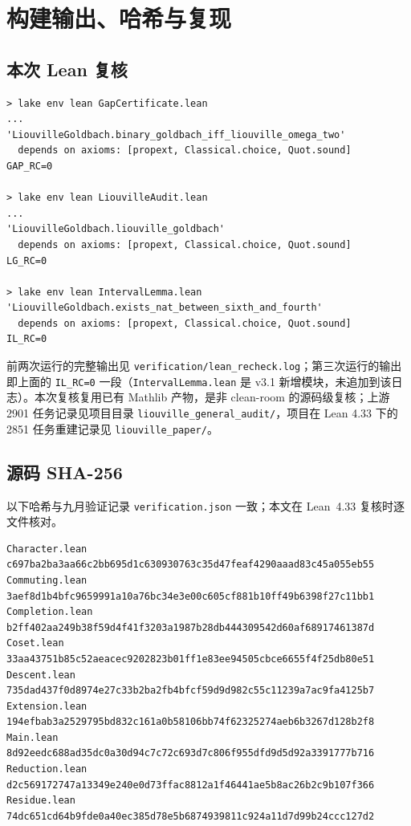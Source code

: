 \documentclass[11pt,a4paper]{ctexart}
\theoremstyle{plain}
\theoremstyle{definition}
\begin{document}
\section{构建输出、哈希与复现}
\label{app:hashes}

\subsection*{本次 Lean 复核}

\begin{verbatim}
> lake env lean GapCertificate.lean
...
'LiouvilleGoldbach.binary_goldbach_iff_liouville_omega_two'
  depends on axioms: [propext, Classical.choice, Quot.sound]
GAP_RC=0

> lake env lean LiouvilleAudit.lean
...
'LiouvilleGoldbach.liouville_goldbach'
  depends on axioms: [propext, Classical.choice, Quot.sound]
LG_RC=0

> lake env lean IntervalLemma.lean
'LiouvilleGoldbach.exists_nat_between_sixth_and_fourth'
  depends on axioms: [propext, Classical.choice, Quot.sound]
IL_RC=0
\end{verbatim}

前两次运行的完整输出见 \texttt{verification/lean\_recheck.log}；第三次运行的输出即上面的 \texttt{IL\_RC=0} 一段（\texttt{IntervalLemma.lean} 是 v3.1 新增模块，未追加到该日志）。本次复核复用已有 Mathlib 产物，是非 clean-room 的源码级复核；上游 2901 任务记录见项目目录 \texttt{liouville\_general\_audit/}，项目在 Lean 4.33 下的 2851 任务重建记录见 \texttt{liouville\_paper/}。

\subsection*{源码 SHA-256}

以下哈希与九月验证记录 \texttt{verification.json} 一致；本文在 Lean~4.33 复核时逐文件核对。

{\footnotesize
\begin{verbatim}
Character.lean   c697ba2ba3aa66c2bb695d1c630930763c35d47feaf4290aaad83c45a055eb55
Commuting.lean   3aef8d1b4bfc9659991a10a76bc34e3e00c605cf881b10ff49b6398f27c11bb1
Completion.lean  b2ff402aa249b38f59d4f41f3203a1987b28db444309542d60af68917461387d
Coset.lean       33aa43751b85c52aeacec9202823b01ff1e83ee94505cbce6655f4f25db80e51
Descent.lean     735dad437f0d8974e27c33b2ba2fb4bfcf59d9d982c55c11239a7ac9fa4125b7
Extension.lean   194efbab3a2529795bd832c161a0b58106bb74f62325274aeb6b3267d128b2f8
Main.lean        8d92eedc688ad35dc0a30d94c7c72c693d7c806f955dfd9d5d92a3391777b716
Reduction.lean   d2c569172747a13349e240e0d73ffac8812a1f46441ae5b8ac26b2c9b107f366
Residue.lean     74dc651cd64b9fde0a40ec385d78e5b6874939811c924a11d7d99b24ccc127d2
\end{verbatim}
}
\end{document}
